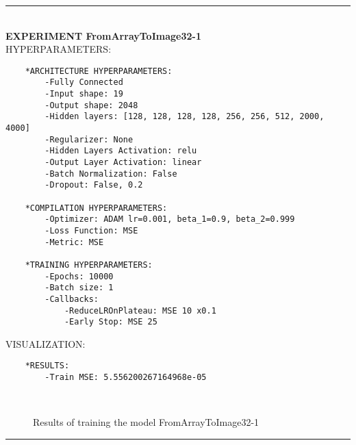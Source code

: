 \rule{0.5\textwidth}{0.5pt}\\

	{\large \textbf{EXPERIMENT FromArrayToImage32-1}}\\
	
	{\normalsize HYPERPARAMETERS:}
	\begin{lstlisting}	
	*ARCHITECTURE HYPERPARAMETERS:
		-Fully Connected
		-Input shape: 19
		-Output shape: 2048
		-Hidden layers: [128, 128, 128, 128, 256, 256, 512, 2000, 4000]
		-Regularizer: None
		-Hidden Layers Activation: relu
		-Output Layer Activation: linear
		-Batch Normalization: False
		-Dropout: False, 0.2
	
	*COMPILATION HYPERPARAMETERS:
		-Optimizer: ADAM lr=0.001, beta_1=0.9, beta_2=0.999
		-Loss Function: MSE
		-Metric: MSE
	
	*TRAINING HYPERPARAMETERS:
		-Epochs: 10000
		-Batch size: 1
		-Callbacks: 
			-ReduceLROnPlateau: MSE 10 x0.1
			-Early Stop: MSE 25
	\end{lstlisting}
	
	{\normalsize VISUALIZATION:}
	\begin{lstlisting}
	*RESULTS:
        -Train MSE: 5.556200267164968e-05
	\end{lstlisting}
	
	\begin{figure*}[ht!]
		\hspace{\fill}
		\hspace{\fill}
		\\
		\caption{Results of training the model FromArrayToImage32-1}
	\end{figure*}
	
\FloatBarrier	
\rule{0.5\textwidth}{0.5pt}\\